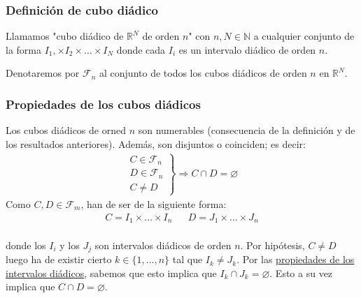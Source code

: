 \documentclass[12pt,a4paper]{article}
\newcommand{\R}{\mathbb{R}}
\newcommand{\N}{\mathbb{N}}
\newcounter{unit}[section]
\renewcommand{\theunit}{\arabic{unit}}
\renewcommand{\thesubsubsection}{\theunit.\arabic{subsubsection}}
\newcommand{\result}[1]{%
  \subsubsection{#1}%
  \label{subsubsection:\thesubsubsection}%
}
\begin{document}
\vspace{6mm}
\result{Definición de cubo diádico}
\hspace{3mm}
Llamamos "cubo diádico de $\R^N$ de orden $n$" con $n, N \in \N$ a cualquier conjunto de
la forma $I_1, \times I_2 \times \ldots \times I_N$ donde cada $I_i$ es un intervalo diádico de orden $n$.

\vspace{2mm} \noindent
Denotaremos por $\mathcal{F}_n$ al conjunto de todos los cubos diádicos de orden $n$ en $\R^N$.

\vspace{4mm}
\result{Propiedades de los cubos diádicos}
\hspace{3mm} Los cubos diádicos de orned $n$ son numerables (consecuencia de la definición y de los resultados anteriores).
Además, son disjuntos o coinciden; es decir:
\begin{align*}
    \left.
    \begin{array}{l}
        C \in \mathcal{F}_n \\
        D \in \mathcal{F}_n \\
        C \neq D
    \end{array}
    \right\}
    \Rightarrow C \cap D = \varnothing
\end{align*}
Como $C,D \in \mathcal{F}_m$, han de ser de la siguiente forma:
\vspace{-2mm}
\begin{align*}
    C = I_1 \times \ldots \times I_n &&
    D = J_1 \times \ldots \times J_n
\end{align*} \\[-5ex]
donde los $I_i$ y los $J_j$ son intervalos diádicos de orden $n$.
Por hipótesis, $C \neq D$ luego ha de existir cierto $k \in \{1, \ldots, n\}$
tal que $I_k \neq J_k$. Por las \hyperref[subsubsection:0.13]{propiedades de los intervalos diádicos},
sabemos que esto implica que $I_k \cap J_k = \varnothing$. Esto a su vez implica que $C \cap D = \varnothing $.
\end{document}
